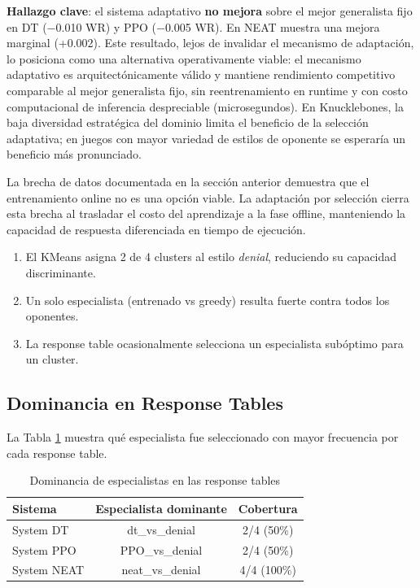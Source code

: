 \textbf{Hallazgo clave}: el sistema adaptativo \textbf{no mejora} sobre el mejor generalista fijo en DT ($-$0.010 WR) y PPO ($-$0.005 WR). En NEAT muestra una mejora marginal (+0.002). Este resultado, lejos de invalidar el mecanismo de adaptación, lo posiciona como una alternativa operativamente viable: el mecanismo adaptativo es arquitectónicamente válido y mantiene rendimiento competitivo comparable al mejor generalista fijo, sin reentrenamiento en runtime y con costo computacional de inferencia despreciable (microsegundos). En Knucklebones, la baja diversidad estratégica del dominio limita el beneficio de la selección adaptativa; en juegos con mayor variedad de estilos de oponente se esperaría un beneficio más pronunciado.

La brecha de datos documentada en la sección anterior demuestra que el entrenamiento online no es una opción viable. La adaptación por selección cierra esta brecha al trasladar el costo del aprendizaje a la fase offline, manteniendo la capacidad de respuesta diferenciada en tiempo de ejecución.

\begin{enumerate}
    \item El KMeans asigna 2 de 4 clusters al estilo \textit{denial}, reduciendo su capacidad discriminante.
    \item Un solo especialista (entrenado vs greedy) resulta fuerte contra todos los oponentes.
    \item La response table ocasionalmente selecciona un especialista subóptimo para un cluster.
\end{enumerate}

\subsection{Dominancia en Response Tables}

La Tabla \ref{tab:dominance} muestra qué especialista fue seleccionado con mayor frecuencia por cada response table.

\begin{table}[H]
\centering
\caption{Dominancia de especialistas en las response tables}
\begin{tabular}{lcc}
\hline
\textbf{Sistema} & \textbf{Especialista dominante} & \textbf{Cobertura} \\
\hline
System DT   & dt\_vs\_denial    & 2/4 (50\%)  \\
System PPO  & PPO\_vs\_denial        & 2/4 (50\%)  \\
System NEAT & neat\_vs\_denial       & 4/4 (100\%) \\
\hline
\end{tabular}
\label{tab:dominance}
\end{table}

